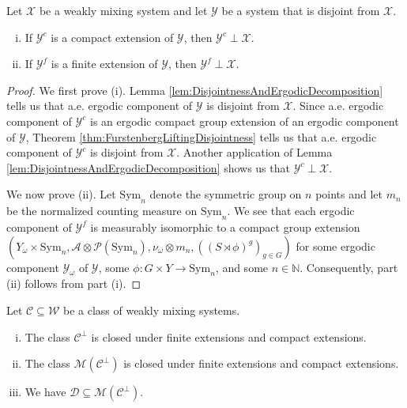 \documentclass[graybox]{svmult}
\theoremstyle{definition}
\begin{document}
\begin{lemma}\label{lem:FiniteExtensionsPreserveDisjointness}
    Let $\mathcal{X}$ be a weakly mixing system and let $\mathcal{Y}$ be a system that is disjoint from $\mathcal{X}$.
    \begin{enumerate}[(i)]
        \item If $\mathcal{Y}^c$ is a compact extension of $\mathcal{Y}$, then $\mathcal{Y}^c\perp\mathcal{X}$.
        
        \item If $\mathcal{Y}^f$ is a finite extension of $\mathcal{Y}$, then $\mathcal{Y}^f\perp\mathcal{X}$.
    \end{enumerate}
\end{lemma}

\begin{proof}
    We first prove (i).
    Lemma \ref{lem:DisjointnessAndErgodicDecomposition} tells us that a.e. ergodic component of $\mathcal{Y}$ is disjoint from $\mathcal{X}$.
    Since a.e. ergodic component of $\mathcal{Y}^c$ is an ergodic compact group extension of an ergodic component of $\mathcal{Y}$, Theorem \ref{thm:FurstenbergLiftingDisjointness} tells us that a.e. ergodic component of $\mathcal{Y}^c$ is disjoint from $\mathcal{X}$.
    Another application of Lemma \ref{lem:DisjointnessAndErgodicDecomposition} shows us that $\mathcal{Y}^c\perp\mathcal{X}$.
    
    We now prove (ii).
    Let $\text{Sym}_n$ denote the symmetric group on $n$ points and let $m_n$ be the normalized counting measure on $\text{Sym}_n$.
    We see that each ergodic component of $\mathcal{Y}^f$ is measurably isomorphic to a compact group extension $(Y_\omega\times \text{Sym}_n,\mathscr{A}\otimes\mathscr{P}(\text{Sym}_n),\nu_\omega\otimes m_n,((S\rtimes\phi)^g)_{g \in G})$ for some ergodic component $\mathcal{Y}_\omega$ of $\mathcal{Y}$, some $\phi:G\times Y\rightarrow \text{Sym}_n$, and some $n \in \mathbb{N}$.
    Consequently, part (ii) follows from part (i).
\end{proof}
    
    \begin{corollary}\label{cor:ClosedUnderCompactExtensions}
        Let $\mathscr{C} \subseteq \mathcal{W}$ be a class of weakly mixing systems.
        \begin{enumerate}[(i)]
            \item The class $\mathscr{C}^\perp$ is closed under finite extensions and compact extensions.

            \item The class $\mathscr{M}(\mathscr{C}^\perp)$ is closed under finite extensions and compact extensions.

            \item We have $\mathcal{D} \subseteq \mathscr{M}(\mathscr{C}^\perp)$.
        \end{enumerate}
    \end{corollary}
\end{document}
